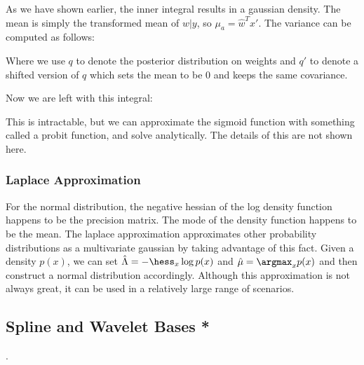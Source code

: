 \documentclass[12pt]{article}
\begin{document}

As we have shown earlier, the inner integral results in a gaussian density. The mean is simply the transformed mean of $w|y$, so $\mu_a = \hat w^T x'$. The variance can be computed as follows:


Where we use $q$ to denote the posterior distribution on weights and $q'$ to denote a shifted version of $q$ which sets the mean to be 0 and keeps the same covariance.

Now we are left with this integral:


This is intractable, but we can approximate the sigmoid function with something called a probit function, and solve analytically. The details of this are not shown here.

\subsubsection{Laplace Approximation}

For the normal distribution, the negative hessian of the log density function happens to be the precision matrix. The mode of the density function happens to be the mean. The laplace approximation approximates other probability distributions as a multivariate gaussian by taking advantage of this fact. Given a density $p(x)$, we can set $\hat \Lambda = - \hess_x \log p(x)$ and $\hat \mu = \argmax_x p(x)$ and then construct a normal distribution accordingly. Although this approximation is not always great, it can be used in a relatively large range of scenarios. 

\subsection{Spline and Wavelet Bases *}
.
\end{document}
